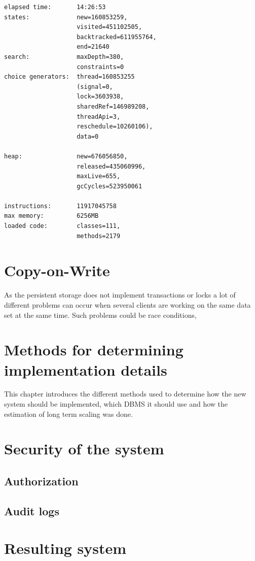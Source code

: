 \documentclass[a4paper,12pt]{article}
\begin{document}
\begin{lstlisting}[label=JPFRESULT,caption=Results of JPF run]
elapsed time:       14:26:53
states:             new=160853259,
                    visited=451102505,
                    backtracked=611955764,
                    end=21640
search:             maxDepth=380,
                    constraints=0
choice generators:  thread=160853255 
                    (signal=0,
                    lock=3603938,
                    sharedRef=146989208,
                    threadApi=3,
                    reschedule=10260106), 
                    data=0

heap:               new=676056850,
                    released=435060996,
                    maxLive=655,
                    gcCycles=523950061

instructions:       11917045758
max memory:         6256MB
loaded code:        classes=111,
                    methods=2179
\end{lstlisting}

\newpage 
\section{Copy-on-Write}
As the persistent storage does not implement transactions or locks a lot of different problems can occur when several 
clients are working on the same data set at the same time. Such problems could be race conditions, 

\section{Methods for determining\\implementation details}
This chapter introduces the different methods used to determine how the new system should be implemented, 
which DBMS it should use and how the estimation of long term scaling was done.

\section{Security of the system}
\subsection{Authorization}
\subsection{Audit logs}


\section{Resulting system}
\end{document}
